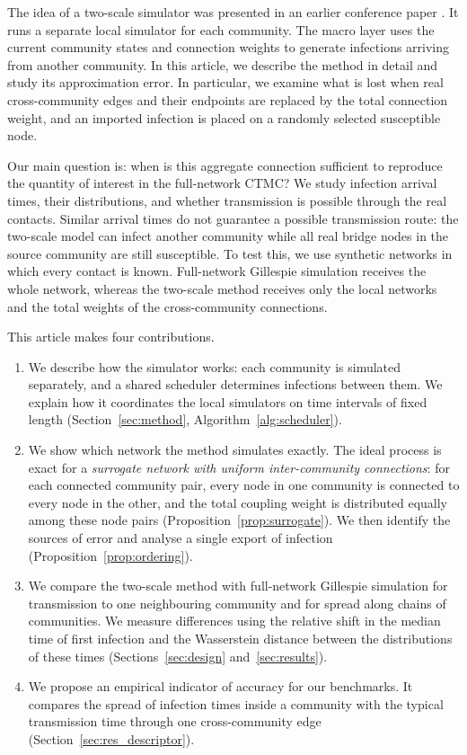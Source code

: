 \documentclass[a4paper,fleqn]{cas-sc}
\begin{document}
The idea of a two-scale simulator was presented in an earlier conference paper \citep{kuryliak2025towards}. It runs a separate local simulator for each community. The macro layer uses the current community states and connection weights to generate infections arriving from another community. In this article, we describe the method in detail and study its approximation error. In particular, we examine what is lost when real cross-community edges and their endpoints are replaced by the total connection weight, and an imported infection is placed on a randomly selected susceptible node.

Our main question is: when is this aggregate connection sufficient to reproduce the quantity of interest in the full-network CTMC? We study infection arrival times, their distributions, and whether transmission is possible through the real contacts. Similar arrival times do not guarantee a possible transmission route: the two-scale model can infect another community while all real bridge nodes in the source community are still susceptible. To test this, we use synthetic networks in which every contact is known. Full-network Gillespie simulation receives the whole network, whereas the two-scale method receives only the local networks and the total weights of the cross-community connections.

This article makes four contributions.
\begin{enumerate}
\item We describe how the simulator works: each community is simulated separately, and a shared scheduler determines infections between them. We explain how it coordinates the local simulators on time intervals of fixed length (Section~\ref{sec:method}, Algorithm~\ref{alg:scheduler}).
\item We show which network the method simulates exactly. The ideal process is exact for a \emph{surrogate network with uniform inter-community connections}: for each connected community pair, every node in one community is connected to every node in the other, and the total coupling weight is distributed equally among these node pairs (Proposition~\ref{prop:surrogate}). We then identify the sources of error and analyse a single export of infection (Proposition~\ref{prop:ordering}).
\item We compare the two-scale method with full-network Gillespie simulation for transmission to one neighbouring community and for spread along chains of communities. We measure differences using the relative shift in the median time of first infection and the Wasserstein distance between the distributions of these times (Sections~\ref{sec:design} and~\ref{sec:results}).
\item We propose an empirical indicator of accuracy for our benchmarks. It compares the spread of infection times inside a community with the typical transmission time through one cross-community edge (Section~\ref{sec:res_descriptor}).
\end{enumerate}
\end{document}
